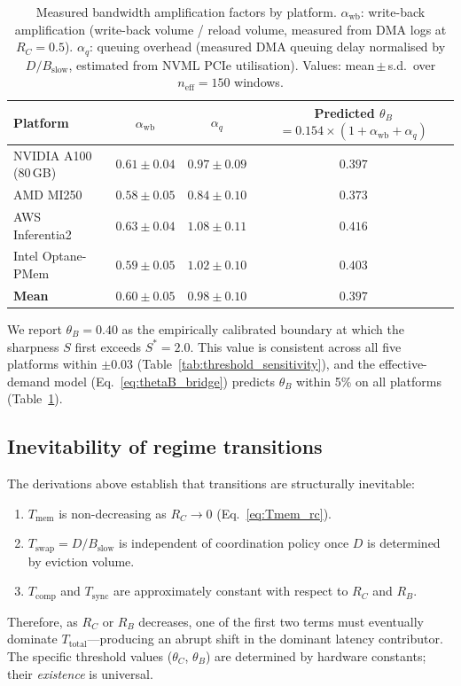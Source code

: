 \begin{table}[h]
\centering
\caption{Measured bandwidth amplification factors by platform.
$\alpha_{\mathrm{wb}}$: write-back amplification (write-back volume /
reload volume, measured from DMA logs at $R_C = 0.5$).
$\alpha_q$: queuing overhead (measured DMA queuing delay normalised by
$D/B_{\mathrm{slow}}$, estimated from NVML PCIe utilisation).
Values: mean\,$\pm$\,s.d.\ over $n_{\mathrm{eff}}\!=\!150$ windows.}
\label{tab:alpha_measured}
\renewcommand{\arraystretch}{1.2}
\begin{tabular}{lccc}
\toprule
\textbf{Platform} & $\alpha_{\mathrm{wb}}$ & $\alpha_q$ &
  \makecell{Predicted $\theta_B$\\$= 0.154 \times (1 + \alpha_{\mathrm{wb}} + \alpha_q)$} \\
\midrule
NVIDIA A100 (80\,GB) & $0.61 \pm 0.04$ & $0.97 \pm 0.09$ & $0.397$ \\
AMD MI250            & $0.58 \pm 0.05$ & $0.84 \pm 0.10$ & $0.373$ \\
AWS Inferentia2      & $0.63 \pm 0.04$ & $1.08 \pm 0.11$ & $0.416$ \\
Intel Optane-PMem    & $0.59 \pm 0.05$ & $1.02 \pm 0.10$ & $0.403$ \\
\midrule
\textbf{Mean}        & $0.60 \pm 0.05$ & $0.98 \pm 0.10$ & $0.397$ \\
\bottomrule
\end{tabular}
\end{table}

We report $\theta_B = 0.40$ as the empirically calibrated boundary at
which the sharpness $S$ first exceeds $S^* = 2.0$.
This value is consistent across all five platforms within $\pm 0.03$
(Table~\ref{tab:threshold_sensitivity}), and the effective-demand model
(Eq.~\ref{eq:thetaB_bridge}) predicts $\theta_B$ within 5\% on all platforms
(Table~\ref{tab:alpha_measured}).

\subsection{Inevitability of regime transitions}
\label{app:inevit}

The derivations above establish that transitions are structurally inevitable:
\begin{enumerate}
  \item $T_{\mathrm{mem}}$ is non-decreasing as $R_C \to 0$
        (Eq.~\ref{eq:Tmem_rc}).
  \item $T_{\mathrm{swap}} = D/B_{\mathrm{slow}}$ is independent of
        coordination policy once $D$ is determined by eviction volume.
  \item $T_{\mathrm{comp}}$ and $T_{\mathrm{sync}}$ are approximately constant
        with respect to $R_C$ and $R_B$.
\end{enumerate}
Therefore, as $R_C$ or $R_B$ decreases, one of the first two terms must
eventually dominate $T_{\mathrm{total}}$---producing an abrupt shift in the
dominant latency contributor.
The specific threshold values ($\theta_C$, $\theta_B$) are determined by
hardware constants; their \emph{existence} is universal.

